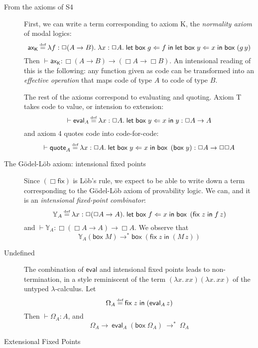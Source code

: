 \documentclass{myifcolog}
\theoremstyle{definition}
\newcommand{\defeq}{\stackrel{\mathclap{\mbox{\tiny def}}}{=}}
\newcommand{\ibox}[1]{\mathsf{box\;}#1}
\newcommand{\letbox}[3]{\mathsf{let\;box\;} #1 \Leftarrow #2 \mathsf{\;in\;} #3}
\newcommand{\fixlob}[2]{\mathsf{fix\;} #1 \mathsf{\;in\;} #2}
\newcommand{\red}{\mathrel{\longrightarrow}}
\newcommand{\redt}{\mathrel{\longrightarrow^\ast}}
\begin{document}
\begin{description}

\item[From the axioms of \textsf{S4}]

First, we can write a term corresponding to axiom \textsf{K}, the
\emph{normality axiom} of modal logics: \[
  \mathsf{ax_K} \defeq
    \lambda f : \Box (A \rightarrow B). \;
    \lambda x : \Box A . \;
      \letbox{g}{f}{\letbox{y}{x}{\ibox{(g\,y)}}}
\]
Then $\vdash \mathsf{ax_K} : \Box(A \rightarrow B) \rightarrow
(\Box A \rightarrow \Box B)$. An intensional reading of this is
the following: any function given as code can be transformed into
an \emph{effective operation} that maps code of type $A$ to code
of type $B$.

The rest of the axioms correspond to evaluating and quoting.
Axiom \textsf{T} takes code to value, or intension to extension:
\[
  \vdash \mathsf{eval}_A \defeq
    \lambda x : \Box A. \; \letbox{y}{x}{y}
      : \Box A \rightarrow A
\] and axiom \textsf{4} quotes code into code-for-code: \[
  \vdash \mathsf{quote}_A \defeq
    \lambda x : \Box A. \;
      \letbox{y}{x}{\ibox{\left(\ibox{y}\right)}}
    : \Box A \rightarrow \Box \Box A
\]

\item[The G\"odel-L\"ob axiom: intensional fixed points]

Since $(\Box\mathsf{fix})$ is L\"ob's rule, we expect to be able
to write down a term corresponding to the G\"odel-L\"ob axiom of
provability logic. We can, and it is an \emph{intensional
fixed-point combinator}: \[
  \mathbb{Y}_A \defeq
    \lambda x : \Box (\Box A \rightarrow A). \;
      \letbox{f}{x}{
          \ibox{\left(\fixlob{z}{f\,z}\right)}
      }
\] and $\vdash \mathbb{Y}_A : \Box(\Box A \rightarrow A)
\rightarrow \Box A$. We observe that \[
  \mathbb{Y}_A(\ibox{M})
    \redt{}
  \ibox{\left(\fixlob{z}{(M\, z)}\right)}
\]

\item[Undefined]

The combination of $\mathsf{eval}$ and intensional fixed points
leads to non-termination, in a style reminiscent of the term
$(\lambda x.\,xx)(\lambda x.\,xx)$ of the untyped
$\lambda$-calculus. Let \[
  \Omega_A \defeq \fixlob{z}{(\mathsf{eval}_A\,z)}
\] Then $\vdash \Omega_A : A$, and \[
  \Omega_A
    \red{}\
  \mathsf{eval}_A\;\left(\ibox{\Omega_A}\right)\
    \redt{}\
  \Omega_A
\]

\item[Extensional Fixed Points]


\end{description}
\end{document}
